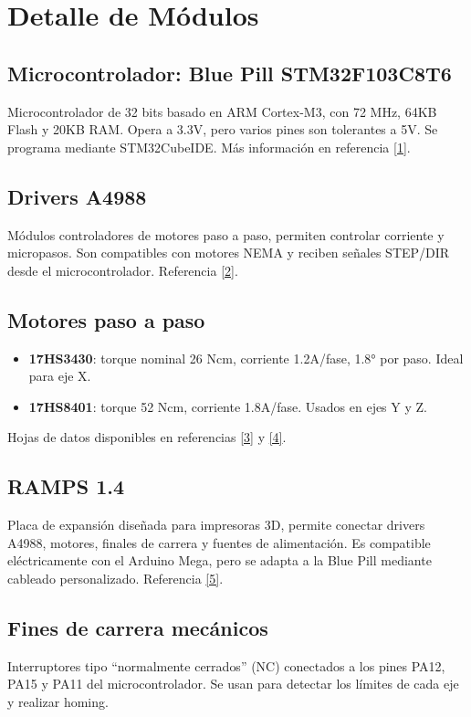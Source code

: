 \section{Detalle de Módulos}

\subsection{Microcontrolador: Blue Pill STM32F103C8T6}
Microcontrolador de 32 bits basado en ARM Cortex-M3, con 72 MHz, 64KB Flash y 20KB RAM. Opera a 3.3V, pero varios pines son tolerantes a 5V. Se programa mediante STM32CubeIDE. Más información en referencia \hyperref[ref1]{[1]}.

\subsection{Drivers A4988}
Módulos controladores de motores paso a paso, permiten controlar corriente y micropasos. Son compatibles con motores NEMA y reciben señales STEP/DIR desde el microcontrolador. Referencia \hyperref[ref2]{[2]}.

\subsection{Motores paso a paso}
\begin{itemize}
  \item \textbf{17HS3430}: torque nominal 26 Ncm, corriente 1.2A/fase, 1.8° por paso. Ideal para eje X.
  \item \textbf{17HS8401}: torque 52 Ncm, corriente 1.8A/fase. Usados en ejes Y y Z.
\end{itemize}
Hojas de datos disponibles en referencias \hyperref[ref3]{[3]} y \hyperref[ref4]{[4]}.

\subsection{RAMPS 1.4}
Placa de expansión diseñada para impresoras 3D, permite conectar drivers A4988, motores, finales de carrera y fuentes de alimentación. Es compatible eléctricamente con el Arduino Mega, pero se adapta a la Blue Pill mediante cableado personalizado. Referencia \hyperref[ref5]{[5]}.

\subsection{Fines de carrera mecánicos}
Interruptores tipo “normalmente cerrados” (NC) conectados a los pines PA12, PA15 y PA11 del microcontrolador. Se usan para detectar los límites de cada eje y realizar homing.

